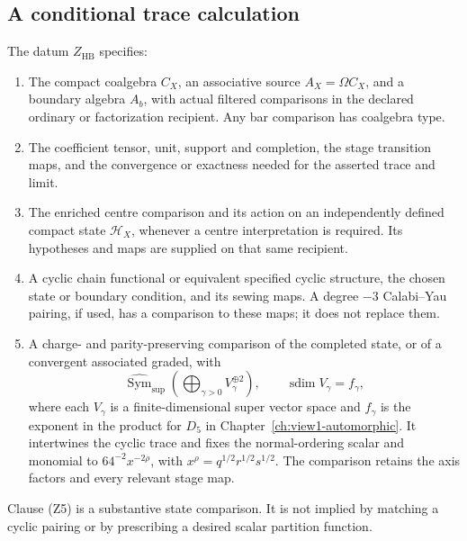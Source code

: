 \subsection{A conditional trace calculation}
\label{app:G-vol2-discharge}

\begin{definition}
\label{def:G-level-Z-trace-datum}
The datum \(Z_{\mathrm{HB}}\) specifies:
\begin{enumerate}
\item[\textup{(Z1)}] The compact coalgebra \(C_X\), an associative
source \(A_X=\Omega C_X\), and a boundary algebra \(A_b\),
with actual filtered comparisons in the declared ordinary or
factorization recipient. Any bar comparison has coalgebra type.
\item[\textup{(Z2)}] The coefficient tensor, unit, support and
completion, the stage transition maps, and the convergence or
exactness needed for the asserted trace and limit.
\item[\textup{(Z3)}] The enriched centre comparison and its action
on an independently defined compact state \(\mathcal H_X\),
whenever a centre interpretation is required. Its hypotheses and
maps are supplied on that same recipient.
\item[\textup{(Z4)}] A cyclic chain functional or equivalent
specified cyclic structure, the chosen state or boundary condition,
and its sewing maps. A degree \(-3\) Calabi--Yau pairing, if
used, has a comparison to these maps; it does not replace them.
\item[\textup{(Z5)}] A charge- and parity-preserving comparison
of the completed state, or of a convergent associated graded, with
\[
 \widehat{\operatorname{Sym}}_{\mathrm{sup}}
       \left(\bigoplus_{\gamma>0}V_\gamma^{\oplus2}\right),
 \qquad
 \operatorname{sdim}V_\gamma=f_\gamma,
\]
where each \(V_\gamma\) is a finite-dimensional super vector
space and \(f_\gamma\) is the exponent in the product for
\(D_5\) in Chapter~\ref{ch:view1-automorphic}. It intertwines the cyclic
trace and fixes the normal-ordering scalar and monomial to
\(64^{-2}x^{-2\rho}\), with
\(x^\rho=q^{1/2}r^{1/2}s^{1/2}\). The comparison retains the
axis factors and every relevant stage map.
\end{enumerate}
Clause \textup{(Z5)} is a substantive state comparison. It is not
implied by matching a cyclic pairing or by prescribing a desired
scalar partition function.
\end{definition}

